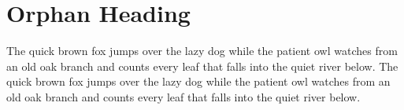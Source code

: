\section{Orphan Heading}
The quick brown fox jumps over the lazy dog while the patient owl watches from an old oak branch and counts every leaf that falls into the quiet river below. The quick brown fox jumps over the lazy dog while the patient owl watches from an old oak branch and counts every leaf that falls into the quiet river below.

